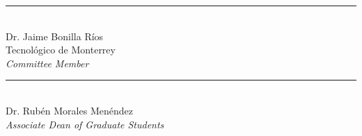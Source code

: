 \documentclass[
11pt, 
oneside,
english,
onehalfspacing,
onehalfspacing,
parskip,
headsepline,
]{MastersDoctoralThesis}
\begin{document}
\begin{committee}
\begin{flushright}
\noindent \rule[0.0em]{15em}{0.5pt}\\ %
Dr. Jaime Bonilla Ríos\\
Tecnológico de Monterrey\\
\emph{Committee Member}

\end{flushright}

\vfill

\begin{center}

\bigskip
\bigskip
\medskip

\noindent \rule[0.0em]{15em}{0.5pt}\\ %
Dr. Rubén Morales Menéndez \\
\emph{Associate Dean of Graduate Students}\\
\deptname\\

\bigskip
\examDate\\[0cm]

\end{center}
\end{committee}

\cleardoublepage

\end{document}
